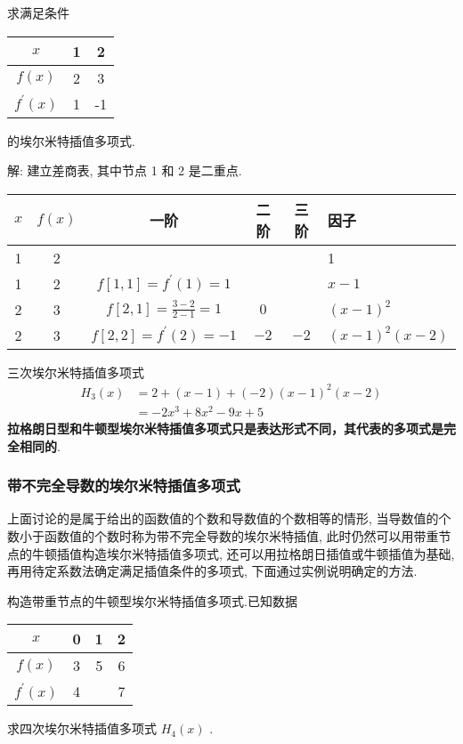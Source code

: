 求满足条件
\begin{tabular}{c|cc}
$ x $ & 1 & 2 \\
\hline$ f(x) $ & 2 & 3 \\
$ f^{\prime}(x) $ & 1 & -1
\end{tabular}
的埃尔米特插值多项式.

解: 建立差商表, 其中节点 1 和 2 是二重点.
\begin{center}
\begin{tabular}{|c|c|c|c|c|l|}
\hline
$ x $ & $ f(x) $ & 一阶 & 二阶 & 三阶 &因子 \\
\hline 1 & 2 & & & & 1 \\
1 & 2 & $ f[1,1]=f^{\prime}(1)=1 $ & & & $ x-1 $ \\
2 & 3 & $ f[2,1]=\frac{3-2}{2-1}=1 $ & $0$ & & $ (x-1)^{2} $ \\
2 & 3 & $ f[2,2]=f^{\prime}(2)=-1 $ &$ -2$ & $-2$ & $ (x-1)^{2}(x-2) $\\
\hline
\end{tabular}
\end{center}

三次埃尔米特插值多项式
$$
\begin{aligned}
H_{3}(x) & =2+(x-1)+(-2)(x-1)^{2}(x-2) \\
& =-2 x^{3}+8 x^{2}-9 x+5
\end{aligned}
$$
\textbf{拉格朗日型和牛顿型埃尔米特插值多项式只是表达形式不同，其代表的多项式是完全相同的}.

\subsubsection{带不完全导数的埃尔米特插值多项式}

上面讨论的是属于给出的函数值的个数和导数值的个数相等的情形, 当导数值的个数小于函数值的个数时称为带不完全导数的埃尔米特插值, 此时仍然可以用带重节点的牛顿插值构造埃尔米特插值多项式, 还可以用拉格朗日插值或牛顿插值为基础, 再用待定系数法确定满足插值条件的多项式, 下面通过实例说明确定的方法.

 构造带重节点的牛顿型埃尔米特插值多项式.已知数据
\begin{tabular}{c|ccc}
$ x $ & 0 & 1 & 2 \\
\hline$ f(x) $ & 3 & 5 & 6 \\
$ f^{\prime}(x) $ & 4 & & 7
\end{tabular}
求四次埃尔米特插值多项式 $ H_{4}(x) $ .


